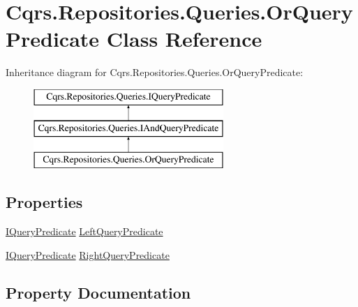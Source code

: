 \hypertarget{classCqrs_1_1Repositories_1_1Queries_1_1OrQueryPredicate}{}\section{Cqrs.\+Repositories.\+Queries.\+Or\+Query\+Predicate Class Reference}
\label{classCqrs_1_1Repositories_1_1Queries_1_1OrQueryPredicate}
Inheritance diagram for Cqrs.\+Repositories.\+Queries.\+Or\+Query\+Predicate\+:\begin{figure}[H]
\begin{center}
\leavevmode
\includegraphics[height=3.000000cm]{classCqrs_1_1Repositories_1_1Queries_1_1OrQueryPredicate}
\end{center}
\end{figure}
\subsection*{Properties}
\begin{DoxyCompactItemize}
\item 
\hyperlink{interfaceCqrs_1_1Repositories_1_1Queries_1_1IQueryPredicate}{I\+Query\+Predicate} \hyperlink{classCqrs_1_1Repositories_1_1Queries_1_1OrQueryPredicate_afd9d98db1920b798bded515a27f0eeb6}{Left\+Query\+Predicate}
\item 
\hyperlink{interfaceCqrs_1_1Repositories_1_1Queries_1_1IQueryPredicate}{I\+Query\+Predicate} \hyperlink{classCqrs_1_1Repositories_1_1Queries_1_1OrQueryPredicate_ae1a81d19657bee8735a977b247fef4d0}{Right\+Query\+Predicate}
\end{DoxyCompactItemize}


\subsection{Property Documentation}
\mbox{\label{classCqrs_1_1Repositories_1_1Queries_1_1OrQueryPredicate_afd9d98db1920b798bded515a27f0eeb6}} 
